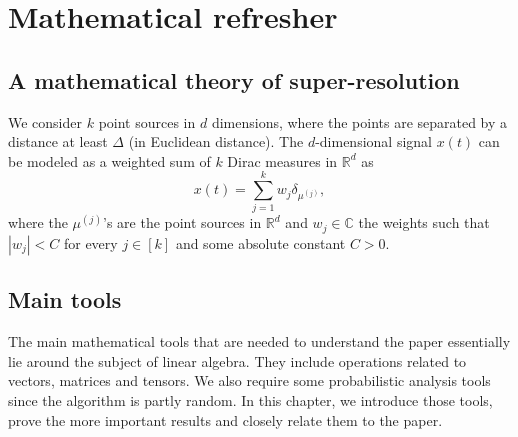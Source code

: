 \chapter{Mathematical refresher}
\section{A mathematical theory of super-resolution}
We consider $k$ point sources in $d$ dimensions, where the points are separated by a distance at least $\Delta$ (in Euclidean distance). The $d$-dimensional signal $x(t)$ can be modeled as a weighted sum of $k$ Dirac measures in $\mathbb{R}^d$ as $$x(t)=\sum_{j=1}^k w_j\delta_{\mu^{(j)}},$$ where the $\mu^{(j)}$'s are the point sources in $\mathbb{R}^d$ and $w_j\in\mathbb{C}$ the weights such that $|w_j|<C$ for every $j\in[k]$ and some absolute constant $C>0$.

\section{Main tools}
The main mathematical tools that are needed to understand the paper essentially lie around the subject of linear algebra. They include operations related to vectors, matrices and tensors. We also require some probabilistic analysis tools since the algorithm is partly random. In this chapter, we introduce those tools, prove the more important results and closely relate them to the paper. 
